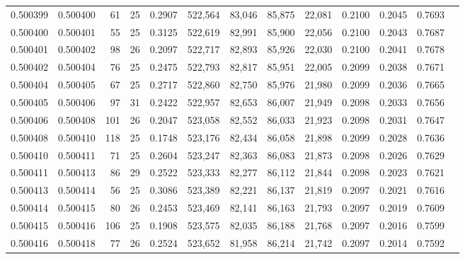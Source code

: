 \begin{tabular}{rrrrrrrrrrrrr}
0.500399 & 0.500400 &  61 &  25 &                                     0.2907 & 522,564 &  83,046 &  85,875 &  22,081 & 0.2100 & 0.2045 & 0.7693 \\
0.500400 & 0.500401 &  55 &  25 &                                     0.3125 & 522,619 &  82,991 &  85,900 &  22,056 & 0.2100 & 0.2043 & 0.7687 \\
0.500401 & 0.500402 &  98 &  26 &                                     0.2097 & 522,717 &  82,893 &  85,926 &  22,030 & 0.2100 & 0.2041 & 0.7678 \\
0.500402 & 0.500404 &  76 &  25 &                                     0.2475 & 522,793 &  82,817 &  85,951 &  22,005 & 0.2099 & 0.2038 & 0.7671 \\
0.500404 & 0.500405 &  67 &  25 &                                     0.2717 & 522,860 &  82,750 &  85,976 &  21,980 & 0.2099 & 0.2036 & 0.7665 \\
0.500405 & 0.500406 &  97 &  31 &                                     0.2422 & 522,957 &  82,653 &  86,007 &  21,949 & 0.2098 & 0.2033 & 0.7656 \\
0.500406 & 0.500408 & 101 &  26 &                                     0.2047 & 523,058 &  82,552 &  86,033 &  21,923 & 0.2098 & 0.2031 & 0.7647 \\
0.500408 & 0.500410 & 118 &  25 &                                     0.1748 & 523,176 &  82,434 &  86,058 &  21,898 & 0.2099 & 0.2028 & 0.7636 \\
0.500410 & 0.500411 &  71 &  25 &                                     0.2604 & 523,247 &  82,363 &  86,083 &  21,873 & 0.2098 & 0.2026 & 0.7629 \\
0.500411 & 0.500413 &  86 &  29 &                                     0.2522 & 523,333 &  82,277 &  86,112 &  21,844 & 0.2098 & 0.2023 & 0.7621 \\
0.500413 & 0.500414 &  56 &  25 &                                     0.3086 & 523,389 &  82,221 &  86,137 &  21,819 & 0.2097 & 0.2021 & 0.7616 \\
0.500414 & 0.500415 &  80 &  26 &                                     0.2453 & 523,469 &  82,141 &  86,163 &  21,793 & 0.2097 & 0.2019 & 0.7609 \\
0.500415 & 0.500416 & 106 &  25 &                                     0.1908 & 523,575 &  82,035 &  86,188 &  21,768 & 0.2097 & 0.2016 & 0.7599 \\
0.500416 & 0.500418 &  77 &  26 &                                     0.2524 & 523,652 &  81,958 &  86,214 &  21,742 & 0.2097 & 0.2014 & 0.7592 \\

\end{tabular}
